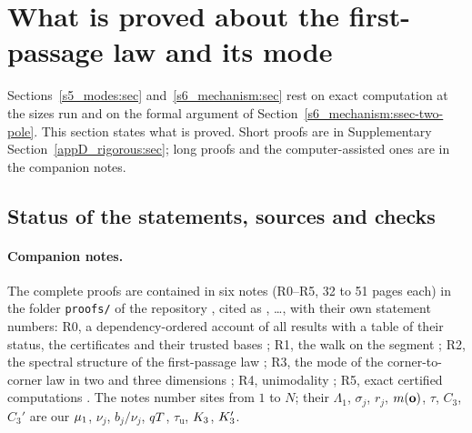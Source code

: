 \section{What is proved about the first-passage law and its mode}\label{s6b_rigorous:sec}

Sections~\ref{s5_modes:sec} and~\ref{s6_mechanism:sec} rest on exact computation at the sizes run and on the formal
argument of Section~\ref{s6_mechanism:ssec-two-pole}. This section states what is proved. Short proofs are in
Supplementary Section~\ref{appD_rigorous:sec}; long proofs and the computer-assisted ones are in the companion notes.

\subsection{Status of the statements, sources and checks}\label{s6b_rigorous:ssec-status}

\paragraph{Companion notes.} The complete proofs are contained in six notes (R0--R5, 32 to 51 pages each) in the
folder \texttt{proofs/} of the repository \citep{ZhouyiRepo}, cited as , \dots,  with their own statement numbers:
R0, a dependency-ordered account of all results with a table of their status, the certificates and their trusted bases
\citep{NoteR0}; R1, the walk on the segment \citep{NoteR1}; R2, the spectral structure of the first-passage law
\citep{NoteR2}; R3, the mode of the corner-to-corner law in two and three dimensions \citep{NoteR3}; R4, unimodality
\citep{NoteR4}; R5, exact certified computations \citep{NoteR5}. The notes number sites from $1$ to
$N$; their $\Lambda_1$, $\sigma_j$, $r_j$, $m(\mathbf{o})$, $\tau$, $C_3$, $C_3'$ are our $\mu_{1}$, $\nu_j$, $b_j/\nu_j$, $qT$,
$\tau_{\mathrm u}$, $K_{3}$, $K_{3}'$.

